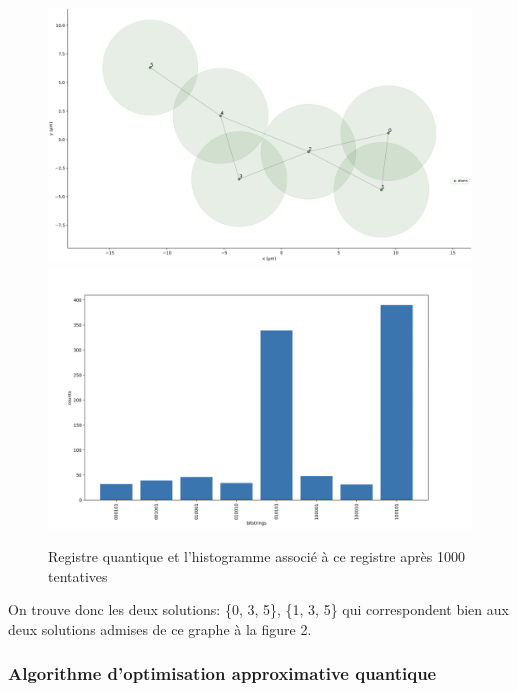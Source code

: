 \documentclass[11pt]{article}
\begin{document}
\begin{figure}[H]
    \centering
    \includegraphics[width = 0.48\linewidth]{images/registre_exemple.png}
    \includegraphics[width=0.49\linewidth]{images/histogram_exemple.png}
    \caption{Registre quantique et l'histogramme associé à ce registre après 1000 tentatives}
    \label{QMIS_exemple}
\end{figure}
    
On trouve donc les deux solutions: \{0, 3, 5\}, \{1, 3, 5\} qui correspondent bien aux deux solutions admises de ce graphe à la figure 2.



\subsubsection{Algorithme d'optimisation approximative quantique} 
 
\end{document}
